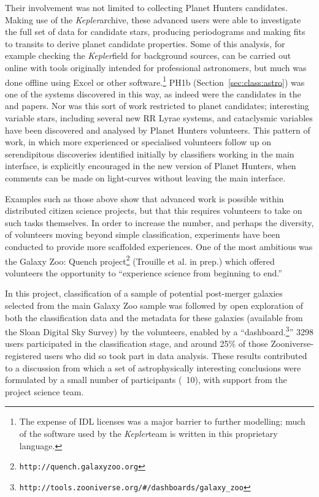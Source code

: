 \documentclass{ar2e}
\def\Sref#1{Section~\ref{#1}\xspace}
\def\CaseStudy#1{\noindent{\it\bf #1 \,\,\,\,}}
\def\url#1{\texttt{#1}}
\def\Kepler{{\it Kepler}}
\begin{document}
Their involvement was not limited to collecting Planet Hunters candidates.
Making use of the \Kepler archive, these advanced users were able to investigate
the full set of data for candidate stars, producing periodograms and making
fits  to transits to derive planet candidate properties. Some of this analysis,
for example checking the \Kepler field for  background sources, can be carried
out online with tools originally intended for professional astronomers, but much
was done offline using Excel or other software.\footnote{The expense of IDL
licenses was a major barrier to further modelling; much of the software used
by the \Kepler team is written in this proprietary language.} 
PH1b (\Sref{sec:class:astro}) was one of the systems discovered in this way, as indeed 
were the candidates in the \citet{Wang2013} and \citet{Schmitt2014} papers.
Nor was this sort of work
restricted to planet candidates; interesting variable stars, including several
new RR Lyrae systems, and cataclysmic variables \citep[e.g.\ ][]{KatoOsaki} 
have been discovered and analysed by Planet Hunters volunteers. This pattern of work, in
which more experienced or specialised volunteers follow up on serendipitous discoveries
identified initially by classifiers working in the main interface, is explicitly encouraged in the
new version of Planet Hunters, when comments can be made on light-curves without leaving the main
interface. 




\CaseStudy{Galaxy Zoo: Quench.} 
Examples such as those above show that advanced work is possible within
distributed citizen science projects, but that this requires volunteers to take
on such tasks themselves. In order to increase the number, and perhaps the
diversity, of volunteers moving beyond simple classification, experiments have
been conducted to provide more scaffolded experiences. One of the most ambitious
was the Galaxy Zoo: Quench project\footnote{\url{http://quench.galaxyzoo.org}}
(Trouille et al. in prep.) which offered volunteers the opportunity to
``experience science from beginning to end.''

In this project, classification of a sample of potential post-merger galaxies
selected from the main Galaxy Zoo sample was followed by open exploration of
both the classification data and the metadata for these galaxies (available from
the Sloan Digital Sky Survey) by the volunteers, enabled by a
``dashboard.\footnote{\url{http://tools.zooniverse.org/\#/dashboards/galaxy\_zoo}}''
3298 users participated in the classification stage, and  around 25\% of
those Zooniverse-registered users who did so took part in data analysis. These results
contributed to a discussion from which a set of astrophysically
interesting conclusions were formulated by a small number of participants (~10),
with support from the project science team.
\end{document}

